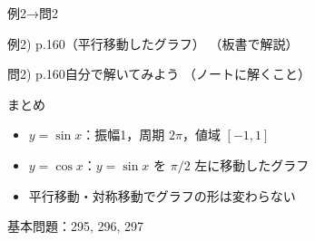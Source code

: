 \documentclass[aspectratio=43,professionalfonts,handout]{beamer}
\begin{document}
\begin{frame}{例2→問2}
  \begin{exampleblock}{例2) p.160（平行移動したグラフ）}
    （板書で解説）
  \end{exampleblock}

  \vfill

  \begin{block}{問2) p.160\quad 自分で解いてみよう}
    （ノートに解くこと）
  \end{block}
\end{frame}

\begin{frame}{まとめ}
  \begin{itemize}
    \item $y = \sin x$：振幅1，周期 $2\pi$，値域 $[-1, 1]$
    \item $y = \cos x$：$y = \sin x$ を $\pi/2$ 左に移動したグラフ
    \item 平行移動・対称移動でグラフの形は変わらない
  \end{itemize}

  \vfill
  {\small 基本問題：295, 296, 297}
\end{frame}
\end{document}
